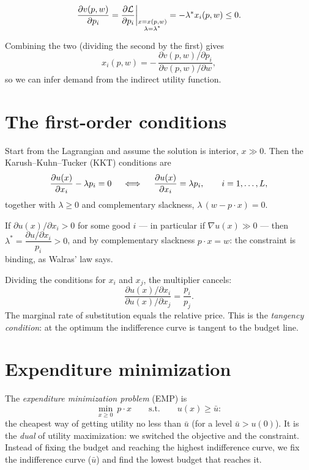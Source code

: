 \documentclass[11pt]{article}
\begin{document}
\[ \frac{\partial v(p,w)}{\partial p_i}
   =\frac{\partial \mathcal{L}}{\partial p_i}\bigg|_{\substack{x=x(p,w)\\ \lambda=\lambda^{*}}}
   =-\lambda^{*}x_i(p,w)\le 0 . \]

Combining the two (dividing the second by the first) gives
\[ x_i(p,w)=-\,\frac{\partial v(p,w)/\partial p_i}{\partial v(p,w)/\partial w}, \]
so we can infer demand from the indirect utility function.


\section{The first-order conditions}

Start from the Lagrangian and assume the solution is interior, $x\gg0$. Then the
Karush--Kuhn--Tucker (KKT) conditions are
\[ \frac{\partial u(x)}{\partial x_i}-\lambda p_i=0
   \quad\iff\quad
   \frac{\partial u(x)}{\partial x_i}=\lambda p_i,\qquad i=1,\dots,L, \]
together with $\lambda\ge0$ and complementary slackness,
$\lambda\,(w-p\cdot x)=0$.

If $\partial u(x)/\partial x_i>0$ for some good $i$ --- in particular if
$\nabla u(x)\gg0$ --- then $\lambda^{*}=\dfrac{\partial u/\partial x_i}{p_i}>0$, and
by complementary slackness $p\cdot x=w$: the constraint is binding, as Walras' law
says.

Dividing the conditions for $x_i$ and $x_j$, the multiplier cancels:
\[ \frac{\partial u(x)/\partial x_i}{\partial u(x)/\partial x_j}=\frac{p_i}{p_j}. \]
The marginal rate of substitution equals the relative price. This is the
\emph{tangency condition}: at the optimum the indifference curve is tangent to the
budget line.


\section{Expenditure minimization}

The \emph{expenditure minimization problem} (EMP) is
\[ \min_{x\ge0}\ p\cdot x\qquad\text{s.t.}\qquad u(x)\ge\bar u : \]
the cheapest way of getting utility no less than $\bar u$ (for a level
$\bar u>u(0)$). It is the \emph{dual} of utility maximization: we switched the
objective and the constraint. Instead of fixing the budget and reaching the highest
indifference curve, we fix the indifference curve ($\bar u$) and find the lowest
budget that reaches it.
\end{document}
